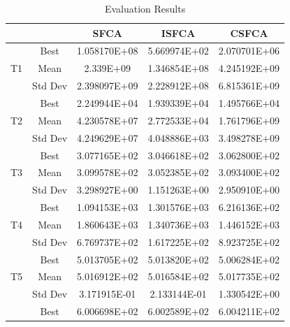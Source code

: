 \documentclass[letterpaper]{article}
\begin{document}
\begin{center}
\begin{table}[htbp]
	\caption{Evaluation Results}
	\begin{center}
		\centering
		\resizebox{\columnwidth}{!}
		{\begin{tabular}{|c|c|c|c|c|}
				\hline
				\multicolumn{1}{|l|}{} & \multicolumn{1}{l|}{} & SFCA & ISFCA & CSFCA \\ \hline
				\multicolumn{ 1}{|c|}{} & Best & 1.058170E+08 & 5.669974E+02 & 2.070701E+06 \\ \cline{ 2- 5}
				\multicolumn{ 1}{|c|}{T1} & Mean & 2.339E+09 & 1.346854E+08 & 4.245192E+09 \\ \cline{ 2- 5}
				\multicolumn{ 1}{|c|}{} & Std Dev & 2.398097E+09 & 2.228912E+08 & 6.815361E+09 \\ \hline
				\multicolumn{ 1}{|c|}{} & Best & 2.249944E+04 & 1.939339E+04 & 1.495766E+04 \\ \cline{ 2- 5}
				\multicolumn{ 1}{|c|}{T2} & Mean & 4.230578E+07 & 2.772533E+04 & 1.761796E+09 \\ \cline{ 2- 5}
				\multicolumn{ 1}{|c|}{} & Std Dev & 4.249629E+07 & 4.048886E+03 & 3.498278E+09 \\ \hline
				\multicolumn{ 1}{|c|}{} & Best & 3.077165E+02 & 3.046618E+02 & 3.062800E+02 \\ \cline{ 2- 5}
				\multicolumn{ 1}{|c|}{T3} & Mean & 3.099578E+02 & 3.052385E+02 & 3.093400E+02 \\ \cline{ 2- 5}
				\multicolumn{ 1}{|c|}{} & Std Dev & 3.298927E+00 & 1.151263E+00 & 2.950910E+00 \\ \hline
				\multicolumn{ 1}{|c|}{} & Best & 1.094153E+03 & 1.301576E+03 & 6.216136E+02 \\ \cline{ 2- 5}
				\multicolumn{ 1}{|c|}{T4} & Mean & 1.860643E+03 & 1.340736E+03 & 1.446152E+03 \\ \cline{ 2- 5}
				\multicolumn{ 1}{|c|}{} & Std Dev & 6.769737E+02 & 1.617225E+02 & 8.923725E+02 \\ \hline
				\multicolumn{ 1}{|c|}{} & Best & 5.013705E+02 & 5.013820E+02 & 5.006284E+02 \\ \cline{ 2- 5}
				\multicolumn{ 1}{|c|}{T5} & Mean & 5.016912E+02 & 5.016584E+02 & 5.017735E+02 \\ \cline{ 2- 5}
				\multicolumn{ 1}{|c|}{} & Std Dev & 3.171915E-01 & 2.133144E-01 & 1.330542E+00 \\ \hline
				\multicolumn{ 1}{|c|}{} & Best & 6.006698E+02 & 6.002589E+02 & 6.004211E+02 \\ \cline{ 2- 5}

\end{tabular}}
\end{center}
\end{table}
\end{center}
\end{document}
